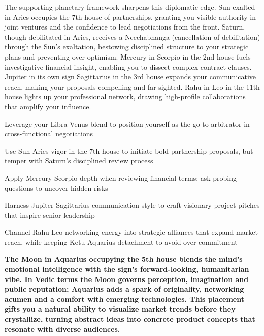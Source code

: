 {\fontsize{9}{13}\selectfont The supporting planetary framework sharpens this diplomatic edge. Sun exalted in Aries occupies the 7th house of partnerships, granting you visible authority in joint ventures and the confidence to lead negotiations from the front. Saturn, though debilitated in Aries, receives a Neechabhanga (cancellation of debilitation) through the Sun's exaltation, bestowing disciplined structure to your strategic plans and preventing over-optimism. Mercury in Scorpio in the 2nd house fuels investigative financial insight, enabling you to dissect complex contract clauses. Jupiter in its own sign Sagittarius in the 3rd house expands your communicative reach, making your proposals compelling and far-sighted. Rahu in Leo in the 11th house lights up your professional network, drawing high-profile collaborations that amplify your influence.}\par\vspace{1.8mm}

\begin{diamondlist}
  \item {\fontsize{8.5}{12}\selectfont Leverage your Libra-Venus blend to position yourself as the go-to arbitrator in cross-functional negotiations}
  \item {\fontsize{8.5}{12}\selectfont Use Sun-Aries vigor in the 7th house to initiate bold partnership proposals, but temper with Saturn's disciplined review process}
  \item {\fontsize{8.5}{12}\selectfont Apply Mercury-Scorpio depth when reviewing financial terms; ask probing questions to uncover hidden risks}
  \item {\fontsize{8.5}{12}\selectfont Harness Jupiter-Sagittarius communication style to craft visionary project pitches that inspire senior leadership}
  \item {\fontsize{8.5}{12}\selectfont Channel Rahu-Leo networking energy into strategic alliances that expand market reach, while keeping Ketu-Aquarius detachment to avoid over-commitment}
\end{diamondlist}


\label{topic27}

{\fontsize{9.5}{13.8}\selectfont\bfseries\color{DeepSlate} The Moon in Aquarius occupying the 5th house blends the mind's emotional intelligence with the sign's forward-looking, humanitarian vibe. In Vedic terms the Moon governs perception, imagination and public reputation; Aquarius adds a spark of originality, networking acumen and a comfort with emerging technologies. This placement gifts you a natural ability to visualize market trends before they crystallize, turning abstract ideas into concrete product concepts that resonate with diverse audiences.}\par\vspace{2mm}

